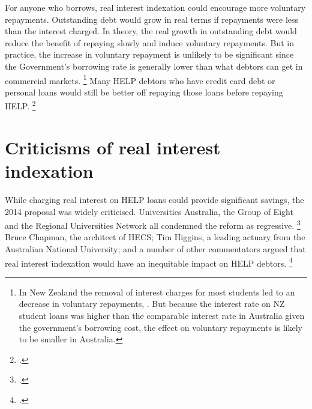 \documentclass{grattan}
\begin{document}
For anyone who borrows, real interest indexation could encourage more voluntary repayments.
Outstanding debt would grow in real terms if repayments were less than the interest charged.
In theory, the real growth in outstanding debt would reduce the benefit of repaying slowly and induce voluntary repayments.
But in practice, the increase in voluntary repayment is unlikely to be significant since the Government's borrowing rate is generally lower than what debtors can get in commercial markets.%
   \footnote{In New Zealand the removal of interest charges for most students led to an decrease in voluntary repayments, \textcite[][34]{EducationNZ2013Studentloanscheme}.
But because the interest rate on NZ student loans was higher than the comparable interest rate in Australia given the government's borrowing cost, the effect on voluntary repayments is likely to be smaller in Australia.} Many \gls{HELP} debtors who have credit card debt or personal loans would still be better off repaying those loans before repaying \gls{HELP}\@.%
\footcite{MoneySmart2016Payingyouruni}

\section{Criticisms of real interest indexation}\label{sec:criticisms-of-real-interest-indexation}

While charging real interest on \gls{HELP} loans could provide significant savings, the 2014 proposal was widely criticised.
Universities Australia, the Group of Eight and the Regional Universities Network all condemned the reform as regressive.%
\footcites{Eight2015Go8submissionSenate}{Australia2015UniversitiesAustraliaSubmission}{RUN2014RUNGo8urge} 
Bruce Chapman, the architect of \gls{HECS}; Tim Higgins, a leading actuary from the Australian National University; and a number of other commentators argued that real interest indexation would have an inequitable impact on \gls{HELP} debtors.%
\footcites{Chapman2014InquiryprovisionsHigher}{Koshy2014effect201415}{Kniest2014endpublichigher}{Struthers-2015-Getting-in-early-avoid-gender-stereotype}
\end{document}
